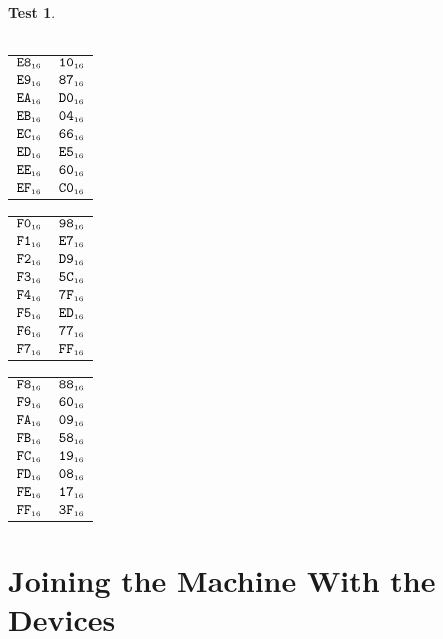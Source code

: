 \documentclass[a4paper,12pt]{article}
\makeatletter
\newcommand{\num}[1]{\texttt{#1}}
\newcommand{\hex}[1]{\num{#1}_{\textup{\tiny 16}}}
\newcommand{\MEM}[1]{\ifthenelse{\equal{#1}{}}{M}{M[#1]}}
\theoremstyle{definition}
\newtheorem{test}{Test}
\newenvironment{memtable}{%
  \begin{trivlist}
    \item
    }{%
    \end{trivlist}}
\newenvironment{memcolumn}{%
  \begin{tabular}{@{}ll@{}}
    \hline}
    {%
    \hline
  \end{tabular}}
\newcommand{\memspace}{\qquad}
\makeatother
\begin{document}
\begin{test}
\begin{memtable}
\begin{memcolumn}
    \end{memcolumn}
    \memspace
    \begin{memcolumn}
      $\hex{E8}$ & $\hex{10}$ \\
      $\hex{E9}$ & $\hex{87}$ \\
      $\hex{EA}$ & $\hex{D0}$ \\
      $\hex{EB}$ & $\hex{04}$ \\
      $\hex{EC}$ & $\hex{66}$ \\
      $\hex{ED}$ & $\hex{E5}$ \\
      $\hex{EE}$ & $\hex{60}$ \\
      $\hex{EF}$ & $\hex{C0}$ \\
    \end{memcolumn}
    \memspace
    \begin{memcolumn}
      $\hex{F0}$ & $\hex{98}$ \\
      $\hex{F1}$ & $\hex{E7}$ \\
      $\hex{F2}$ & $\hex{D9}$ \\
      $\hex{F3}$ & $\hex{5C}$ \\
      $\hex{F4}$ & $\hex{7F}$ \\
      $\hex{F5}$ & $\hex{ED}$ \\
      $\hex{F6}$ & $\hex{77}$ \\
      $\hex{F7}$ & $\hex{FF}$ \\
    \end{memcolumn}
    \memspace
    \begin{memcolumn}
      $\hex{F8}$ & $\hex{88}$ \\
      $\hex{F9}$ & $\hex{60}$ \\
      $\hex{FA}$ & $\hex{09}$ \\
      $\hex{FB}$ & $\hex{58}$ \\
      $\hex{FC}$ & $\hex{19}$ \\
      $\hex{FD}$ & $\hex{08}$ \\
      $\hex{FE}$ & $\hex{17}$ \\
      $\hex{FF}$ & $\hex{3F}$ \\
    \end{memcolumn}
  \end{memtable}
\end{test}

\section{Joining the Machine With the Devices}
\label{sec:building-devices}
\end{document}
